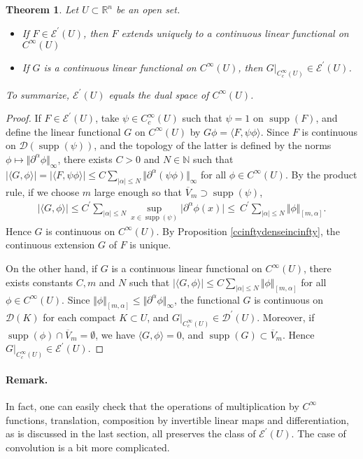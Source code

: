 \documentclass{article}
\numberwithin{equation}{section}
\newcommand{\bbN}{\mathbb{N}}
\newcommand{\bbR}{\mathbb{R}}
\renewcommand{\cal}{\mathcal}
\newcommand{\ol}{\overline}
\DeclareMathOperator{\supp}{supp}
\theoremstyle{plain}
\newtheorem{theorem}{Theorem}[section]
\theoremstyle{definition}
\begin{document}
\begin{theorem}
Let $U\subset\bbR^n$ be an open set.
\begin{itemize}
	\item[(i)] If $F\in\cal{E}^\prime(U)$, then $F$ extends uniquely to a continuous linear functional on $C^\infty(U)$
	\item[(ii)] If $G$ is a continuous linear functional on $C^\infty(U)$, then $G|_{C_c^\infty(U)}\in\cal{E}^\prime(U)$.
\end{itemize} 
To summarize, $\cal{E}^\prime(U)$ equals the dual space of $C^\infty(U)$.
\end{theorem}
\begin{proof}
If $F\in\cal{E}^\prime(U)$, take $\psi\in C_c^\infty(U)$ such that $\psi=1$ on $\supp(F)$, and define the linear functional $G$ on $C^\infty(U)$ by $G\phi=\langle F,\psi\phi\rangle$. Since $F$ is continuous on $\cal{D}(\supp(\psi))$, and the topology of the latter is defined by the norms $\phi\mapsto\Vert\partial^\alpha\phi\Vert_\infty$, there exists $C>0$ and $N\in\bbN$ such that $\vert\langle G,\phi\rangle\vert=\vert\langle F,\psi\phi\rangle\vert\leq C\sum_{\vert\alpha\vert\leq N}\Vert\partial^\alpha(\psi\phi)\Vert_\infty$ for all $\phi\in C^\infty(U)$. By the product rule, if we choose $m$ large enough so that $\ol{V}_m\supset\supp(\psi)$,
\begin{align*}
	\vert\langle G,\phi\rangle\vert\leq C^\prime\sum_{\vert\alpha\vert\leq N}\sup_{x\in\supp(\psi)}\vert\partial^\alpha\phi(x)\vert\leq\ C^\prime\sum_{\vert\alpha\vert\leq N}\Vert\phi\Vert_{[m,\alpha]}.
\end{align*}
Hence $G$ is continuous on $C^\infty(U)$. By Proposition \ref{ccinftydenseincinfty}, the continuous extension $G$ of $F$ is unique.

On the other hand, if $G$ is a continuous linear functional on $C^\infty(U)$, there exists constants $C,m$ and $N$ such that $\vert\langle G,\phi\rangle\vert\leq C\sum_{\vert\alpha\vert\leq N}\Vert\phi\Vert_{[m,\alpha]}$ for all $\phi\in C^\infty(U)$. Since $\Vert\phi\Vert_{[m,\alpha]}\leq\Vert\partial^\alpha\phi\Vert_\infty$, the functional $G$ is continuous on $\cal{D}(K)$ for each compact $K\subset U$, and $G|_{C_c^\infty(U)}\in\cal{D}^\prime(U)$. Moreover, if $\supp(\phi)\cap\ol{V}_m=\emptyset$, we have $\langle G,\phi\rangle=0$, and $\supp(G)\subset\ol{V}_m$. Hence $G|_{C_c^\infty(U)}\in\cal{E}^\prime(U)$.
\end{proof}
\paragraph{Remark.} In fact, one can easily check that the operations of multiplication by $C^\infty$ functions, translation, composition by invertible linear maps and differentiation, as is discussed in the last section, all preserves the class of $\cal{E}^\prime(U)$. The case of convolution is a bit more complicated.
\end{document}
